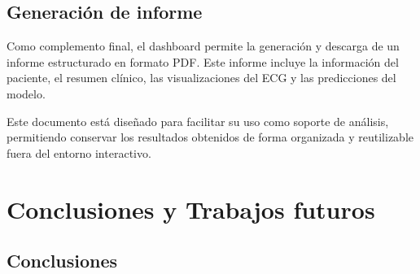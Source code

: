 \documentclass[12pt,a4paper,twoside]{book}
\begin{document}
\section{Generación de informe}

Como complemento final, el dashboard permite la generación y descarga de un informe estructurado en formato PDF. Este informe incluye la información del paciente, el resumen clínico, las visualizaciones del ECG y las predicciones del modelo.

Este documento está diseñado para facilitar su uso como soporte de análisis, permitiendo conservar los resultados obtenidos de forma organizada y reutilizable fuera del entorno interactivo.


\chapter{Conclusiones y Trabajos futuros}


\section{Conclusiones}
\end{document}
